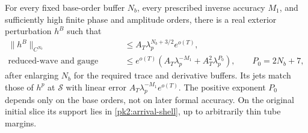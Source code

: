 \begin{proposition}
\label{pk2:beam-proposition}
For every fixed base-order buffer $N_b$, every prescribed inverse
accuracy $M_1$, and sufficiently high finite phase and amplitude
orders, there is a real exterior perturbation $h^B$ such that
\begin{equation}
 \begin{split}
 \|h^B\|_{C^{N_b}}&\le A_T\lambda_p^{N_b+3/2}e^{o(T)},\\
 \text{reduced-wave and gauge residuals}
   &\le e^{o(T)}
       \left(A_T\lambda_p^{-M_1}+A_T^2\lambda_p^{P_0}\right),
 \qquad P_0=2N_b+7,
 \end{split}
 \tag{E2}\label{pk2:beam-estimates}
\end{equation}
after enlarging $N_b$ for the required trace and derivative buffers.
Its jets match those of $h^p$ at $\mathcal S$ with linear error
$A_T\lambda_p^{-M_1}e^{o(T)}$. The positive exponent $P_0$ depends
only on the base orders, not on later formal accuracy. On the
original initial slice its support lies in
\eqref{pk2:arrival-shell}, up to arbitrarily thin tube margins.
\end{proposition}
